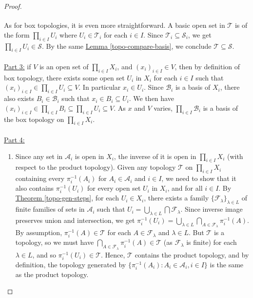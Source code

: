 \documentclass{treatise}
\begin{document}
\begin{shaded}
\begin{proof}
\\
\\
As for box topologies, it is even more straightforward. A basic open set in $\mathcal{T}$ is of the form $\prod_{i \in I} U_i$ where $U_i \in \mathcal{T}_i$ for each $i \in I$. Since $\mathcal{T}_i \subseteq \mathcal{S}_i$, we get $\prod_{i \in I} U_i \in \mathcal{S}$. By the same \hyperref[topo-compare-basis]{Lemma \ref*{topo-compare-basis}}, we conclude $\mathcal{T} \subseteq \mathcal{S}$.
\\
\\
\underline{Part 3:} if $V$ is an open set of $\prod_{i \in I} X_i$, and $(x_i)_{i \in I} \in V$, then by definition of box topology, there exists some open set $U_i$ in $X_i$ for each $i \in I$ such that $(x_i)_{i \in I} \in \prod_{i \in I} U_i \subseteq V$. In particular $x_i \in U_i$. Since $\mathcal{B}_i$ is a basis of $X_i$, there also exists $B_i \in \mathcal{B}_i$ such that $x_i \in B_i \subseteq  U_i$. We then have $(x_i)_{i \in I} \in \prod_{i \in I} B_i \subseteq \prod_{i \in I} U_i \subseteq V$. As $x$ and $V$ varies, $\prod_{i \in I} \mathcal{B}_i$ is a basis of the box topology on $\prod_{i \in I} X_i$.
\\
\\
\underline{Part 4:}
\begin{enumerate}[label = (\alph*)]
    \item Since any set in $\mathcal{A}_i$ is open in $X_i$, the inverse of it is open in $\prod_{i \in I} X_i$ (with respect to the product topology). Given any topology $\mathcal{T}$ on $\prod_{i \in I} X_i$ containing every $\pi_i^{-1}(A_i)$ for $A_i \in \mathcal{A}_i$ and $i \in I$, we need to show that it also contains $\pi_i^{-1}(U_i)$ for every open set $U_i$ in $X_i$, and for all $i \in I$. By \hyperref[topo-gen-steps]{Theorem \ref*{topo-gen-steps}}, for each $U_i \in X_i$, there exists a family $\{ \mathcal{F}_\lambda \}_{\lambda \in L}$ of finite families of sets in $\mathcal{A}_i$ such that $U_i = \bigcup_{\lambda \in L} \bigcap \mathcal{F}_\lambda$. Since inverse image preserves union and intersection, we get $\pi_i^{-1}(U_i) = \bigcup_{\lambda \in L} \bigcap_{A \in \mathcal{F}_\lambda} \pi_i^{-1}(A)$. By assumption, $\pi_i^{-1}(A) \in \mathcal{T}$ for each $A \in \mathcal{F}_\lambda$ and $\lambda \in L$. But $\mathcal{T}$ is a topology, so we must have $\bigcap_{A \in \mathcal{F}_\lambda} \pi_i^{-1}(A) \in \mathcal{T}$ (as $\mathcal{F}_\lambda$ is finite) for each $\lambda \in L$, and so $\pi_i^{-1}(U_i) \in \mathcal{T}$. Hence, $\mathcal{T}$ contains the product topology, and by definition, the topology generated by $\{ \pi_i^{-1}(A_i) : A_i \in \mathcal{A}_i, i \in I \}$ is the same as the product topology.
\end{enumerate}


\end{proof}
\end{shaded}
\end{document}
